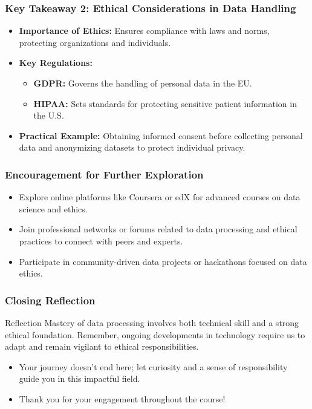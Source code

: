 \documentclass[aspectratio=169]{beamer}
\begin{document}
\begin{frame}[fragile]
    \frametitle{Key Takeaway 2: Ethical Considerations in Data Handling}
    \begin{itemize}
        \item \textbf{Importance of Ethics:} Ensures compliance with laws and norms, protecting organizations and individuals.
        \item \textbf{Key Regulations:}
        \begin{itemize}
            \item \textbf{GDPR:} Governs the handling of personal data in the EU.
            \item \textbf{HIPAA:} Sets standards for protecting sensitive patient information in the U.S.
        \end{itemize}
        \item \textbf{Practical Example:} Obtaining informed consent before collecting personal data and anonymizing datasets to protect individual privacy.
    \end{itemize}
\end{frame}

\begin{frame}[fragile]
    \frametitle{Encouragement for Further Exploration}
    \begin{itemize}
        \item Explore online platforms like Coursera or edX for advanced courses on data science and ethics.
        \item Join professional networks or forums related to data processing and ethical practices to connect with peers and experts.
        \item Participate in community-driven data projects or hackathons focused on data ethics.
    \end{itemize}
\end{frame}

\begin{frame}[fragile]
    \frametitle{Closing Reflection}
    \begin{block}{Reflection}
        Mastery of data processing involves both technical skill and a strong ethical foundation. Remember, ongoing developments in technology require us to adapt and remain vigilant to ethical responsibilities. 
    \end{block}
    \begin{itemize}
        \item Your journey doesn't end here; let curiosity and a sense of responsibility guide you in this impactful field.
        \item Thank you for your engagement throughout the course! 
    \end{itemize}
\end{frame}
\end{document}
